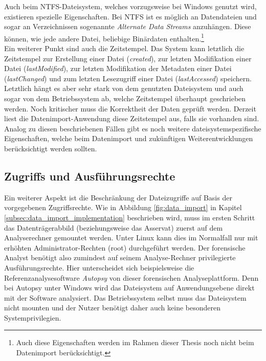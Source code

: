 \noindent
Auch beim NTFS-Dateisystem, welches vorzugsweise bei Windows genutzt wird, existieren spezielle Eigenschaften. Bei NTFS ist es möglich an Datendateien und sogar an Verzeichnissen sogenannte \textit{Alternate Data Streams} anzuhängen. Diese können, wie jede andere Datei, beliebige Binärdaten enthalten.\footnote{Auch diese Eigenschaften werden im Rahmen dieser Thesis noch nicht beim Datenimport berücksichtigt.}\\

\noindent
Ein weiterer Punkt sind auch die Zeitstempel. Das System kann letztlich die Zeitstempel zur Erstellung einer Datei (\textit{created}), zur letzten Modifikation einer Datei (\textit{lastModified}), zur letzten Modifikation der Metadaten einer Datei (\textit{lastChanged}) und zum letzten Lesezugriff einer Datei (\textit{lastAccessed}) speichern. Letztlich hängt es aber sehr stark von dem genutzten Dateisystem und auch sogar von dem Betriebssystem ab, welche Zeitstempel überhaupt geschrieben werden. Noch kritischer muss die Korrektheit der Daten geprüft werden. Derzeit liest die Datenimport-Anwendung diese Zeitstempel aus, falls sie vorhanden sind.\\

\noindent
Analog zu diesen beschriebenen Fällen gibt es noch weitere dateisystemspezifische Eigenschaften, welche beim Datenimport und zukünftigen Weiterentwicklungen berücksichtigt werden sollten. 

\subsection{Zugriffs und Ausführungsrechte}
\label{subsec:data_import_access_rights}
Ein weiterer Aspekt ist die Beschränkung der Dateizugriffe auf Basis der vorgegebenen Zugriffsrechte. Wie in Abbildung \ref{fig:data_import} in Kapitel \ref{subsec:data_import_implementation} beschrieben wird, muss im ersten Schritt das Datenträgerabbild (beziehungsweise das Asservat) zuerst auf dem Analyserechner gemountet werden. Unter Linux kann dies im Normalfall nur mit erhöhten Administrator-Rechten (root) durchgeführt werden. Der forensische Analyst benötigt also zumindest auf seinem Analyse-Rechner privilegierte Ausführungsrechte. Hier unterscheidet sich beispielsweise die Referenzanalysesoftware \textit{Autopsy} von dieser forensischen Analyseplattform. Denn bei Autopsy unter Windows wird das Dateisystem auf Anwendungsebene direkt mit der Software analysiert. Das Betriebssystem selbst muss das Dateisystem nicht mounten und der Nutzer benötigt daher auch keine besonderen Systemprivilegien.\\

